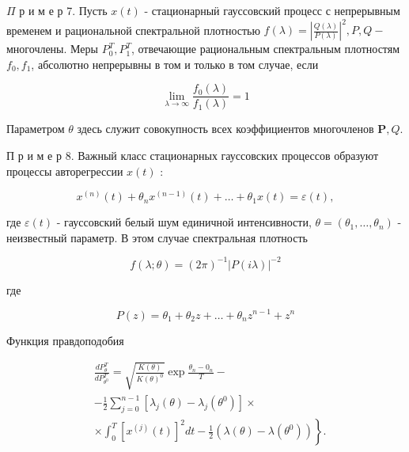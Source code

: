 \documentclass[10pt]{article}
\begin{document}
$\Pi$ р и м е р 7. Пусть $x(t)$ - стационарныӥ гауссовский процесс с непрерывным временем и рациональной спектральной плотностью $f(\lambda)=\left|\frac{Q(\lambda)}{P(\lambda)}\right|^{2}, P, Q-$ многочлены. Меры $P_{0}^{T}, P_{1}^{T}$, отвечающие рациональным спектральным плотностям $f_{0}, f_{1}$, абсолютно непрерывны в том и только в том случае, если



\[

\lim _{\lambda \rightarrow \infty} \frac{f_{0}(\lambda)}{f_{1}(\lambda)}=1

\]



Параметром $\theta$ здесь служит совокупность всех коэффициентов многочленов $\boldsymbol{P}, Q$.



П р и м е р 8. Важный класс стационарных гауссовских процессов образуют процессы авторегрессии $x(t)$ :



\[

x^{(n)}(t)+\theta_{n} x^{(n-1)}(t)+\ldots+\theta_{1} x(t)=\varepsilon(t),

\]



где $\varepsilon(t)$ - гауссовский белый шум единичной интенсивности, $\theta=\left(\theta_{1}, \ldots, \theta_{n}\right)$ - неизвестный параметр. В этом случае спектральная плотность



\[

f(\lambda ; \theta)=(2 \pi)^{-1}|P(i \lambda)|^{-2}

\]



где



\[

P(z)=\theta_{1}+\theta_{2} z+\ldots+\theta_{n} z^{n-1}+z^{n}

\]



Функция правдоподобия



\[

\begin{aligned}

& \frac{d P_{\theta}^{T}}{d P_{\theta^{0}}^{T}}=\sqrt{\frac{K(\theta)}{K(\theta)^{0}}} \exp \frac{\theta_{n}-0_{n}}{T}- \\

&-\frac{1}{2} \sum_{j=0}^{n-1}\left[\lambda_{j}(\theta)-\lambda_{j}\left(\theta^{0}\right)\right] \times \\

&\left.\times \int_{0}^{T}\left[x^{(j)}(t)\right]^{2} d t-\frac{1}{2}\left(\lambda(\theta)-\lambda\left(\theta^{0}\right)\right)\right\} .

\end{aligned}

\]
\end{document}
